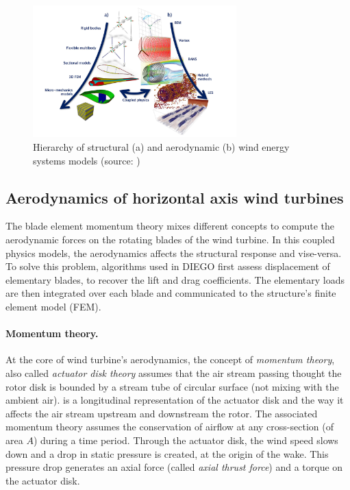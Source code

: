 \begin{figure}
    \centering
    \includegraphics[width=0.7\textwidth]{./part1/figures/OWT_modeling_fidelities.png}
    \caption{Hierarchy of structural (a) and aerodynamic (b) wind energy systems models (source: \citet{veers_2019_review})}
    \label{fig:owt_modeling_fidelities}
\end{figure}



\subsection{Aerodynamics of horizontal axis wind turbines}

The blade element momentum theory mixes different concepts to compute the aerodynamic forces on the rotating blades of the wind turbine.
In this coupled physics models, the aerodynamics affects the structural response and vise-versa. 
To solve this problem, algorithms used in DIEGO first assess displacement of elementary blades, to recover the lift and drag coefficients. 
The elementary loads are then integrated over each blade and communicated to the structure's finite element model (FEM).


\paragraph{Momentum theory.}
At the core of wind turbine's aerodynamics, the concept of \textit{momentum theory}, also called \textit{actuator disk theory} assumes that the air stream passing thought the rotor disk is bounded by a stream tube of circular surface (not mixing with the ambient air). 
 is a longitudinal representation of the actuator disk and the way it affects the air stream upstream and downstream the rotor. 
The associated momentum theory assumes the conservation of airflow at any cross-section (of area $A$) during a time period. 
Through the actuator disk, the wind speed slows down and a drop in static pressure is created, at the origin of the wake. 
This pressure drop generates an axial force (called \textit{axial thrust force}) and a torque on the actuator disk.

